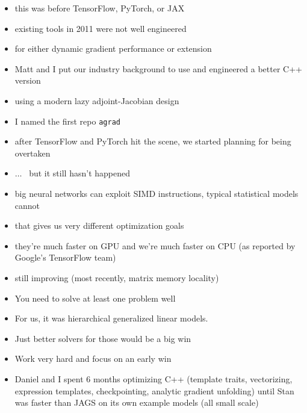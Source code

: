 \documentclass[9pt]{report}
\begin{document}
\begin{itemize}
  \item this was before TensorFlow, PyTorch, or JAX
\item existing tools in 2011 were not well engineered
\item for either dynamic gradient performance or extension
\item Matt and I put our industry background to use and engineered a
  better C++ version 
\item using a modern lazy adjoint-Jacobian design
\item I named the first repo \texttt{agrad} 
\end{itemize}

\begin{itemize}
\item after TensorFlow and PyTorch hit the scene, we started planning
  for being overtaken
\item $\ldots$ \ but it still hasn't happened
\item big neural networks can exploit SIMD instructions, typical
  statistical models cannot
\item that gives us very different optimization goals
\item they're much faster on GPU and we're much faster on CPU (as
  reported by Google's TensorFlow team)
\item still improving (most recently, matrix memory locality)
\end{itemize}

\begin{itemize}
\item You need to solve at least one problem well
\item For us, it was hierarchical generalized linear models.
\item Just better solvers for those would be a big win
\item Work very hard and focus on an early win
  \item Daniel and I spent 6 months optimizing C++ (template
    traits, vectorizing, expression templates, checkpointing, analytic
    gradient unfolding) until Stan was faster than JAGS on its own example
    models (all small scale) 
\end{itemize}
\end{document}
